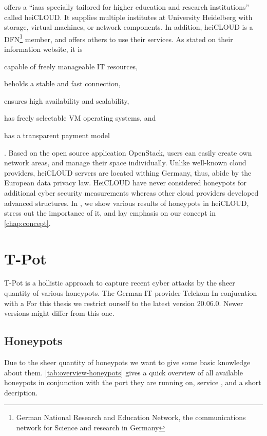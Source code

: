 \citet{urz2021} offers a \enquote{\ac{iaas} specially tailored for higher education and research institutions} called heiCLOUD.
It supplies multiple institutes at University Heidelberg with storage, virtual machines, or network components.
In addition, heiCLOUD is a DFN\footnote{German National Research and Education Network,  the communications network for Science and research in Germany} member, and offers others to use their services.
As stated on their information website\cite{heicloud2021}, it is
\begin{enumerate*}[label=(\roman*)]
    \item capable of freely manageable IT resources,
    \item beholds a stable and fast connection,
    \item ensures high availability and scalability,
    \item has freely selectable VM operating systems, and
    \item has a transparent payment model
\end{enumerate*} \cite{heicloud2021}.
Based on the open source application OpenStack, users can easily create own network areas, and manage their space individually.
Unlike well-known cloud providers, heiCLOUD servers are located withing Germany, thus, abide by the European data privacy law.
HeiCLOUD have never considered honeypots for additional cyber security measurements whereas other cloud providers developed advanced structures.
In , we show various results of honeypots in heiCLOUD, stress out the importance of it, and lay emphasis on our concept in \autoref{chap:concept}.

\section{T-Pot}

T-Pot is a hollistic approach to capture recent cyber attacks by the sheer quantity of various honeypots.
The German IT provider Telekom  
In conjucntion with a 
For this thesis we restrict ourself to the latest version 20.06.0. Newer versions might differ from this one.

\subsection{Honeypots}

Due to the sheer quantity of honeypots we want to give some basic knowledge about them. \autoref{tab:overview-honeypots} gives a quick overview of all available honeypots in conjunction with the port they are running on, service , and a short decription.

